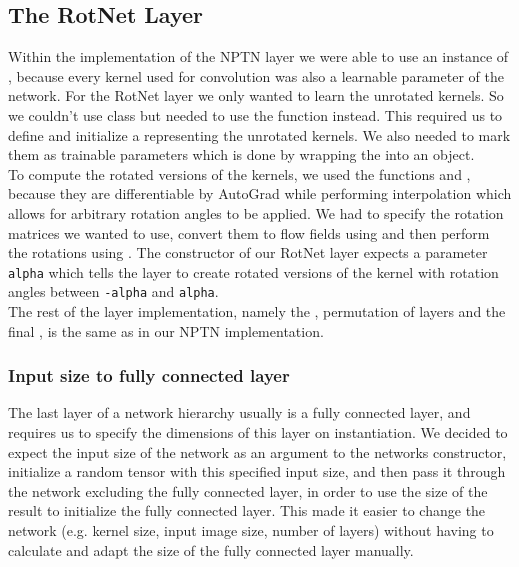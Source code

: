 \documentclass{llncs}
\begin{document}
\subsection{The RotNet Layer}
Within the implementation of the NPTN layer we were able to use an instance of \nnConvLayer, because every kernel used for convolution was also a learnable parameter of the network.
For the RotNet layer we only wanted to learn the unrotated kernels. So we couldn't use \nnConvLayer class but needed to use the \nnConvFunction  function instead.
This required us to define and initialize a \nnTensor representing the unrotated kernels. We also needed to mark them as trainable parameters which is done by wrapping the \nnTensor into an \nnParameter object.\\
To compute the rotated versions of the kernels, we used the functions \nnaffinegrid and \nngridsample, because they are differentiable by AutoGrad while performing interpolation which allows for arbitrary rotation angles to be applied. We had to specify the rotation matrices we wanted to use, convert them to flow fields using \nnaffinegrid and then perform the rotations using \nngridsample. The constructor of our RotNet layer expects a parameter \nolinkurl{alpha} which tells the layer to create rotated versions of the kernel with rotation angles between \nolinkurl{-alpha} and \nolinkurl{alpha}.\\
The rest of the layer implementation, namely the \nnMaxPool, permutation of layers and the final \nnAvgPool, is the same as in our NPTN implementation.



\subsubsection{Input size to fully connected layer}
The last layer of a network hierarchy usually is a fully connected layer, and \pytorch requires us to specify the dimensions of this layer on instantiation. We decided to expect the input size of the network as an argument to the networks constructor, initialize a random tensor with this specified input size, and then pass it through the network excluding the fully connected layer, in order to use the size of the result to initialize the fully connected layer. This made it easier to change the network (e.g. kernel size, input image size, number of layers) without having to calculate and adapt the size of the fully connected layer manually. 
\end{document}
